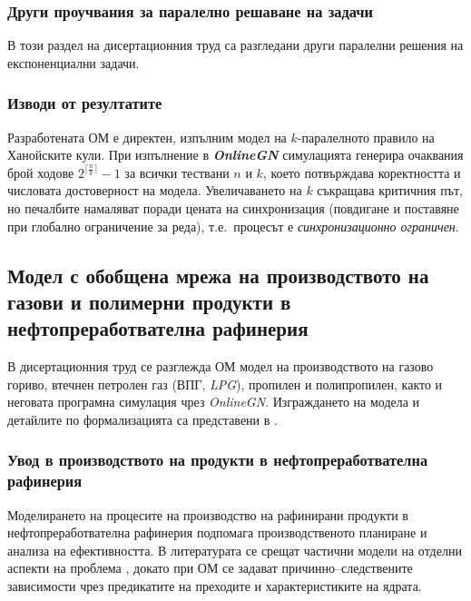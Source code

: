 \subsubsection{Други проучвания за паралелно решаване на задачи}
\hspace*{2.5em}В този раздел на дисертационния труд са разгледани други паралелни решения на експоненциални задачи.

\subsubsection{Изводи от резултатите}
\hspace*{2.5em}Разработената ОМ е директен, изпълним модел на $k$-паралелното правило на Ханойските кули. При изпълнение в \textbf{\textit{OnlineGN}} симулацията генерира очаквания брой ходове \(2^{\bigl\lceil \textstyle \frac{n}{k} \bigr\rceil} - 1\) за всички тествани \(n\) и \(k\), което потвърждава коректността и числовата достоверност на модела. Увеличаването на \(k\) съкращава критичния път, но печалбите намаляват поради цената на синхронизация (повдигане и поставяне при глобално ограничение за реда), т.е.\ процесът е \emph{синхронизационно ограничен}. 

\subsection{Модел с обобщена мрежа на производството на газови и полимерни продукти в нефтопреработвателна рафинерия}

\hspace*{2.5em}В дисертационния труд се разглежда ОМ модел на производството на газово гориво, втечнен петролен газ (ВПГ, \textit{LPG}), пропилен и полипропилен, както и неговата програмна симулация чрез \textit{OnlineGN}. Изграждането на модела и детайлите по формализацията са представени в \cite{DIS-Stratiev2023_1}.

\subsubsection{Увод в производството на продукти в нефтопреработвателна рафинерия}

\hspace*{2.5em}Моделирането на процесите на производство на рафинирани продукти в нефтопреработвателна рафинерия подпомага производственото планиране и анализа на ефективността. В литературата се срещат частични модели на отделни аспекти на проблема \cite{DIS-Zhou2017, Infosys2018, 40}, докато при ОМ се задават причинно--следствените зависимости чрез предикатите на преходите и характеристиките на ядрата.


